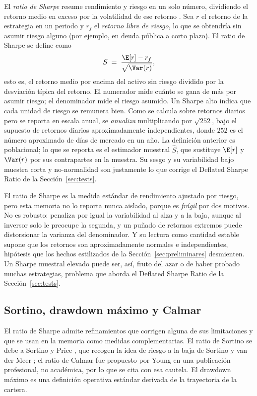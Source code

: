 El \emph{ratio de Sharpe} resume rendimiento y riesgo en un solo número, dividiendo el retorno medio en exceso por la volatilidad de ese retorno \cite{sharpe1994}. Sea $r$ el retorno de la estrategia en un periodo y $r_f$ el \emph{retorno libre de riesgo}, lo que se obtendría sin asumir riesgo alguno (por ejemplo, en deuda pública a corto plazo). El ratio de Sharpe se define como
\[
S \;=\; \frac{\E[r] - r_f}{\sqrt{\Var(r)}},
\]
esto es, el retorno medio por encima del activo sin riesgo dividido por la desviación típica del retorno. El numerador mide cuánto se gana de más por asumir riesgo; el denominador mide el riesgo asumido. Un Sharpe alto indica que cada unidad de riesgo se remunera bien. Como se calcula sobre retornos diarios pero se reporta en escala anual, se \emph{anualiza} multiplicando por $\sqrt{252}$, bajo el supuesto de retornos diarios aproximadamente independientes, donde $252$ es el número aproximado de días de mercado en un año. La definición anterior es poblacional; lo que se reporta es el estimador muestral $\hat S$, que sustituye $\E[r]$ y $\Var(r)$ por sus contrapartes en la muestra. Su sesgo y su variabilidad bajo muestra corta y no-normalidad son justamente lo que corrige el Deflated Sharpe Ratio de la Sección~\ref{sec:tests}.

El ratio de Sharpe es la medida estándar de rendimiento ajustado por riesgo, pero esta memoria no lo reporta nunca aislado, porque es \emph{frágil} por dos motivos. No es robusto: penaliza por igual la variabilidad al alza y a la baja, aunque al inversor solo le preocupe la segunda, y un puñado de retornos extremos puede distorsionar la varianza del denominador. Y su lectura como cantidad estable supone que los retornos son aproximadamente normales e independientes, hipótesis que los hechos estilizados de la Sección~\ref{sec:preliminares} desmienten. Un Sharpe muestral elevado puede ser, así, fruto del azar o de haber probado muchas estrategias, problema que aborda el Deflated Sharpe Ratio de la Sección~\ref{sec:tests}.

\subsection{Sortino, drawdown máximo y Calmar}
\label{sec:economia-otros}

El ratio de Sharpe admite refinamientos que corrigen alguna de sus limitaciones y que se usan en la memoria como medidas complementarias. El ratio de Sortino se debe a Sortino y Price \cite{sortino1994}, que recogen la idea de riesgo a la baja de Sortino y van der Meer \cite{sortino1991}; el ratio de Calmar fue propuesto por Young \cite{young1991} en una publicación profesional, no académica, por lo que se cita con esa cautela. El drawdown máximo es una definición operativa estándar derivada de la trayectoria de la cartera.

